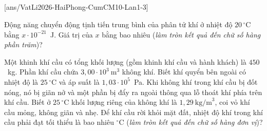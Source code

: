 	\subsection*{}
	\setcounter{ex}{0}
	[ans/VatLi2026-HaiPhong-CumCM10-Lan1-3]

	\begin{ex}%
		Động năng chuyển động tịnh tiến trung bình của phân tử khí ở nhiệt độ $20\,^\circ\text{C}$ bằng $x\cdot 10^{-21}$~J. Giá trị của $x$ bằng bao nhiêu (\textit{làm tròn kết quả đến chữ số hàng phần trăm})?
		\par
	\end{ex}

	\begin{ex}%
		Một khinh khí cầu có tổng khối lượng (gồm khinh khí cầu và hành khách) là $450$~kg. Phần khí cầu chứa $3{,}00\cdot 10^3~\text{m}^3$ không khí. Biết khí quyển bên ngoài có nhiệt độ là $25\,^\circ\text{C}$ và áp suất là $1{,}03\cdot 10^5$~Pa. Khi không khí trong khí cầu bị đốt nóng, nó bị giãn nở và một phần bị đẩy ra ngoài thông qua lỗ thoát khí phía trên khí cầu. Biết ở $25\,^\circ\text{C}$ khối lượng riêng của không khí là $1{,}29~\text{kg/m}^3$, coi vỏ khí cầu mỏng, không giãn và nhẹ. Để khí cầu rời khỏi mặt đất, nhiệt độ khí trong khí cầu phải đạt tối thiểu là bao nhiêu $^\circ$C (\textit{làm tròn kết quả đến chữ số hàng đơn vị})?
		\par
	\end{ex}

